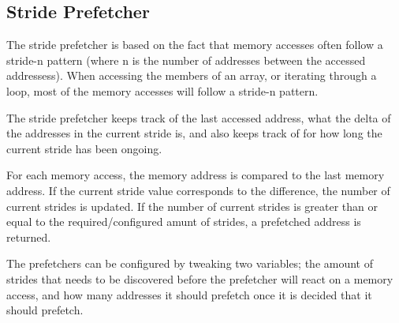 \subsection{Stride Prefetcher}
\label{sec:stridePrefetcher}
The stride prefetcher is based on the fact that memory accesses
often follow a stride-n pattern (where n is the number of addresses between
the accessed addressess). When accessing the members of an
array, or iterating through a loop, most of the memory accesses will
follow a stride-n pattern.

The stride prefetcher keeps track of the last accessed address, what the delta of the addresses in the current stride is, and
also keeps track of for how long the current stride has been
ongoing. 

For each memory access, the memory address is compared to the last
memory address. If the current stride value corresponds to the
difference, the number of current strides is updated. If the number of
current strides is greater than or equal to the required/configured
amunt of strides, a prefetched address is returned.  

The prefetchers can be configured by tweaking two variables;
the amount of strides that needs to be discovered before
the prefetcher will react on a memory access, and how many addresses it should prefetch once it is decided that it should prefetch.

